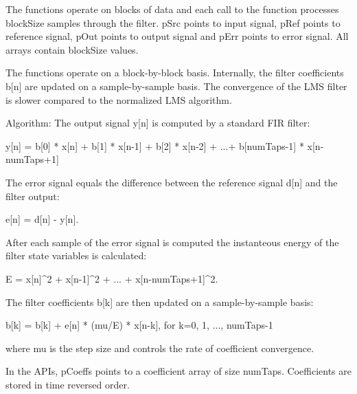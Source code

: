The functions operate on blocks of data and each call to the function processes {\ttfamily block\-Size} samples through the filter. {\ttfamily p\-Src} points to input signal, {\ttfamily p\-Ref} points to reference signal, {\ttfamily p\-Out} points to output signal and {\ttfamily p\-Err} points to error signal. All arrays contain {\ttfamily block\-Size} values.

The functions operate on a block-\/by-\/block basis. Internally, the filter coefficients {\ttfamily b\mbox{[}n\mbox{]}} are updated on a sample-\/by-\/sample basis. The convergence of the L\-M\-S filter is slower compared to the normalized L\-M\-S algorithm.

\begin{DoxyParagraph}{Algorithm\-: }
The output signal {\ttfamily y\mbox{[}n\mbox{]}} is computed by a standard F\-I\-R filter\-: 
\begin{DoxyPre}   
     y[n] = b[0] * x[n] + b[1] * x[n-1] + b[2] * x[n-2] + ...+ b[numTaps-1] * x[n-numTaps+1]   
 \end{DoxyPre}

\end{DoxyParagraph}
\begin{DoxyParagraph}{}
The error signal equals the difference between the reference signal {\ttfamily d\mbox{[}n\mbox{]}} and the filter output\-: 
\begin{DoxyPre}   
     e[n] = d[n] - y[n].   
 \end{DoxyPre}

\end{DoxyParagraph}
\begin{DoxyParagraph}{}
After each sample of the error signal is computed the instanteous energy of the filter state variables is calculated\-: 
\begin{DoxyPre}   
    E = x[n]^2 + x[n-1]^2 + ... + x[n-numTaps+1]^2.   
 \end{DoxyPre}
 The filter coefficients {\ttfamily b\mbox{[}k\mbox{]}} are then updated on a sample-\/by-\/sample basis\-: 
\begin{DoxyPre}   
     b[k] = b[k] + e[n] * (mu/E) * x[n-k],  for k=0, 1, ..., numTaps-1   
 \end{DoxyPre}
 where {\ttfamily mu} is the step size and controls the rate of coefficient convergence. 
\end{DoxyParagraph}
\begin{DoxyParagraph}{}
In the A\-P\-Is, {\ttfamily p\-Coeffs} points to a coefficient array of size {\ttfamily num\-Taps}. Coefficients are stored in time reversed order. 
\end{DoxyParagraph}

